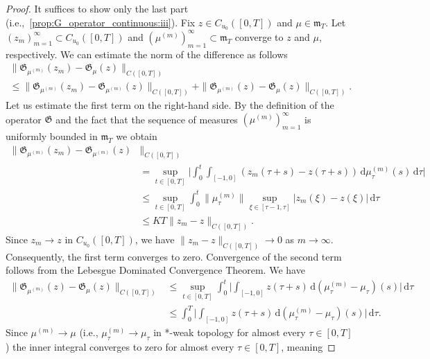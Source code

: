 \documentclass[reqno]{amsart}
\theoremstyle{plain}
\numberwithin{equation}{section}
\numberwithin{definition}{section}
\newcommand{\dd}{\ensuremath{\mathrm{d}}}
\begin{document}
\begin{proof}
    It suffices to show only the last part (i.e.,~\ref{prop:G_operator_continuous:iii}). Fix $z\in C_{u_0}([0,T])$ and $\mu \in  \mathfrak{m}_T$. Let  $(z_m)_{m=1}^{\infty}\subset C_{u_0}([0,T])$ and $(\mu^{(m)})_{m=1}^{\infty}\subset \mathfrak{m}_T$ converge to $z$ and $\mu$, respectively. We can estimate the norm of the difference as follows
\begin{multline*}
    \|\mathfrak{G}_{\mu^{(m)}}(z_m) - \mathfrak{G}_\mu(z)\|_{C([0,T])} \\ \le \|\mathfrak{G}_{\mu^{(m)}}(z_m) - \mathfrak{G}_{\mu^{(m)}}(z)\|_{C([0,T])} + \|\mathfrak{G}_{\mu^{(m)}}(z) - \mathfrak{G}_\mu(z)\|_{C([0,T])}.
\end{multline*}
Let us estimate the first term on the right-hand side. By the definition of the operator $\mathfrak{G}$ and the fact that the sequence of measures $(\mu^{(m)})_{m=1}^\infty$ is uniformly bounded in $\mathfrak{m}_T$ we obtain 
\begin{equation*}
\begin{split}
    \|\mathfrak{G}_{\mu^{(m)}}(z_m) -   \mathfrak{G}_{\mu^{(m)}}(z)&\|_{C([0,T])}  \\ & =  \sup_{t \in [0,T]} \Big| \int_0^t \int_{[-1,0]} (z_m(\tau+s) - z(\tau+s)) \, \dd \mu^{(m)}_{\tau}(s) \, \dd \tau \Big| \\
&\le \sup_{t \in [0,T]} \int_0^t \|\mu^{(m)}_{\tau}\| \sup_{\xi \in [\tau-1, \tau]} |z_m(\xi) - z(\xi)| \,\dd\tau \\
&\le KT  \|z_m - z\|_{C([0,T])}.
\end{split}
\end{equation*}
Since $z_m \to z$ in $C_{u_0}([0,T])$, we have $\|z_m - z\|_{C([0,T])} \to 0$ as $m \to \infty$. Consequently, the first term converges to zero. Convergence of the second term follows from the Lebesgue Dominated Convergence Theorem. We have 
\begin{equation*}
    \begin{split}
        \|\mathfrak{G}_{\mu^{(m)}}(z) - \mathfrak{G}_\mu(z)\|_{C([0,T])} &\le \sup_{t \in [0,T]} \int_0^t \Big| \int_{[-1,0]} z(\tau+s) \, \dd(\mu^{(m)}_{\tau} - \mu_\tau)(s) \Big| \,\dd\tau \\
&\le \int_0^T \Big| \int_{[-1,0]} z(\tau+s) \,\dd(\mu^{(m)}_{\tau} - \mu_\tau)(s) \Big|\, \dd\tau.
    \end{split}
\end{equation*}
Since $\mu^{(m)} \to \mu$ (i.e., $\mu^{(m)}_{\tau} \to \mu_{\tau}$ in *-weak topology for almost every $\tau \in [0,T]$) the inner integral converges to zero for almost every $\tau \in [0,T]$, meaning

\end{proof}
\end{document}

